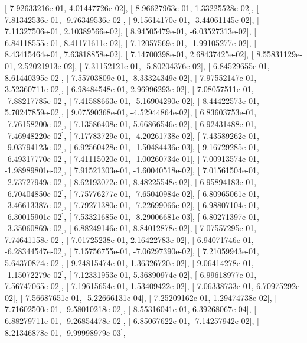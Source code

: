 \documentclass{article}
\begin{document}
       [  7.92633216e-01,   4.01447726e-02],
       [  8.96627963e-01,   1.33225528e-02],
       [  7.81342536e-01,  -9.76349536e-02],
       [  9.15614170e-01,  -3.44061145e-02],
       [  7.11327506e-01,   2.10389566e-02],
       [  8.94505479e-01,  -6.03527313e-02],
       [  6.84118555e-01,   8.41171611e-02],
       [  7.12057569e-01,  -1.99105277e-02],
       [  8.43415464e-01,   7.63818858e-02],
       [  7.14700398e-01,   2.68437425e-02],
       [  8.55831129e-01,   2.52021913e-02],
       [  7.31152121e-01,  -5.80204376e-02],
       [  6.84529655e-01,   8.61440395e-02],
       [  7.55703809e-01,  -8.33324349e-02],
       [  7.97552147e-01,   3.52360711e-02],
       [  6.98484548e-01,   2.96996293e-02],
       [  7.08057511e-01,  -7.88217785e-02],
       [  7.41588663e-01,  -5.16904290e-02],
       [  8.44422573e-01,   5.70247859e-02],
       [  9.07590368e-01,  -4.52944864e-02],
       [  6.83603753e-01,  -7.76158200e-02],
       [  7.13586408e-01,   5.66866546e-02],
       [  6.92431488e-01,  -7.46948220e-02],
       [  7.17783729e-01,  -4.20261738e-02],
       [  7.43589262e-01,  -9.03794123e-02],
       [  6.92560428e-01,  -1.50484436e-03],
       [  9.16729285e-01,  -6.49317770e-02],
       [  7.41115020e-01,  -1.00260734e-01],
       [  7.00913574e-01,  -1.98989801e-02],
       [  7.91521303e-01,  -1.60040518e-02],
       [  7.01561504e-01,  -2.73727949e-02],
       [  8.62193072e-01,   8.48225548e-02],
       [  6.95894183e-01,  -6.70404850e-02],
       [  7.75776277e-01,  -7.65040984e-02],
       [  6.80965061e-01,  -3.46613387e-02],
       [  7.79271380e-01,  -7.22699066e-02],
       [  6.98807104e-01,  -6.30015901e-02],
       [  7.53321685e-01,  -8.29006681e-03],
       [  6.80271397e-01,  -3.35060869e-02],
       [  6.88249146e-01,   8.84012878e-02],
       [  7.07557295e-01,   7.74641158e-02],
       [  7.01725238e-01,   2.16422783e-02],
       [  6.94071746e-01,  -6.28344547e-02],
       [  7.15756755e-01,  -7.06297390e-02],
       [  7.21059943e-01,   5.64370874e-02],
       [  9.24815474e-01,   1.36326720e-02],
       [  9.06414278e-01,  -1.15072279e-02],
       [  7.12331953e-01,   5.36890974e-02],
       [  6.99618977e-01,   7.56747065e-02],
       [  7.19615654e-01,   1.53409422e-02],
       [  7.06338733e-01,   6.70975292e-02],
       [  7.56687651e-01,  -5.22666131e-04],
       [  7.25209162e-01,   1.29474738e-02],
       [  7.71602500e-01,  -9.58010218e-02],
       [  8.55316041e-01,   6.39268067e-04],
       [  6.88279711e-01,  -9.26854478e-02],
       [  6.85067622e-01,  -7.14257942e-02],
       [  8.21346878e-01,  -9.99998979e-03],
\end{document}
